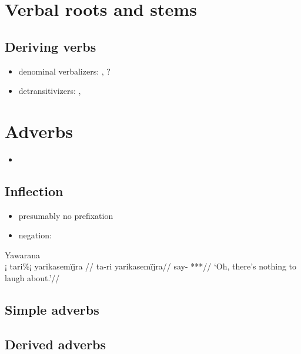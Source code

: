 \documentclass{memoir}
\begin{document}
\chapter{\texorpdfstring{Verbal roots and stems
\label{derbderiv}}{Verbal roots and stems }}

\section{Deriving verbs}

\begin{itemize}
\tightlist
\item
  denominal verbalizers: , ?
\item
  detransitivizers: , 
\end{itemize}

\chapter{\texorpdfstring{Adverbs \label{adverbs}}{Adverbs }}

\begin{itemize}
\tightlist
\item
\end{itemize}

\section{Inflection}

\begin{itemize}
\tightlist
\item
  presumably no prefixation
\item
  negation:
\end{itemize}

\ex Yawarana \\
\label{convrisamaj-52}    \begingl
    \glpreamble ¡ tari\%¡ yarikasemïjra //
    \gla ta-ri yarikasemïjra//
    \glb say- ***//
        \glft ‘Oh, there’s nothing to laugh about.’//  
    \endgl 
\xe

\section{\texorpdfstring{Simple adverbs
\label{sec:simpleadv}}{Simple adverbs }}

\section{\texorpdfstring{Derived adverbs
\label{sec:derivedadv}}{Derived adverbs }}
\end{document}
